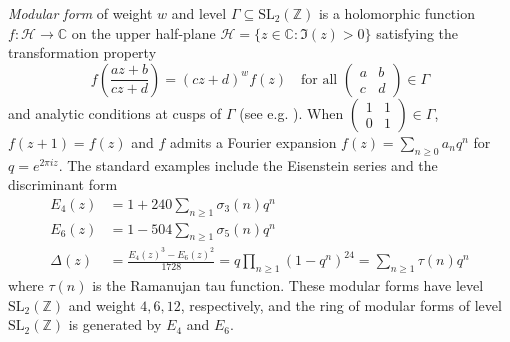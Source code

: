 \documentclass[10pt,reqno]{amsproc}
\newcommand{\SL}{\mathrm{SL}}
\newcommand{\bC}{\mathbb{C}}
\newcommand{\bZ}{\mathbb{Z}}
\newcommand{\cH}{\mathcal{H}}
\newcommand{\1}{\mathds{1}}	%
\theoremstyle{definition}
\theoremstyle{remark}
\begin{document}
\emph{Modular form} of weight $w$ and level $\Gamma \subseteq \SL_2(\bZ)$ is a holomorphic function $f:\cH \to \bC$ on the upper half-plane $\cH = \{ z \in \bC : \Im(z) > 0\}$ satisfying the transformation property
\[
f\left(\frac{az+b}{cz+d}\right) = (cz+d)^w f(z) \quad \text{for all } \begin{pmatrix} a & b \\ c & d \end{pmatrix} \in \Gamma
\]
and analytic conditions at cusps of $\Gamma$ (see e.g. \cite{diamond2005first}).
When $\left(\begin{smallmatrix}
    1 & 1 \\ 0 & 1
\end{smallmatrix}\right) \in \Gamma$, $f(z + 1) = f(z)$ and $f$ admits a Fourier expansion $f(z) = \sum_{n \ge 0} a_n q^n$ for $q = e^{2 \pi i z}$.
The standard examples include the Eisenstein series and the discriminant form
\begin{align}
    E_4(z) &= 1 + 240 \sum_{n \ge 1} \sigma_3(n) q^n \\
    E_6(z) &= 1 - 504 \sum_{n \ge 1} \sigma_5(n) q^n \\
    \Delta(z) &= \frac{E_4(z)^3 - E_6(z)^2}{1728} = q\prod_{n \ge 1}(1 - q^n)^{24} = \sum_{n \ge 1} \tau(n) q^n
\end{align}
where $\tau(n)$ is the Ramanujan tau function.
These modular forms have level $\SL_2(\bZ)$ and weight $4, 6, 12$, respectively, and the ring of modular forms of level $\SL_2(\bZ)$ is generated by $E_4$ and $E_6$.
\end{document}
